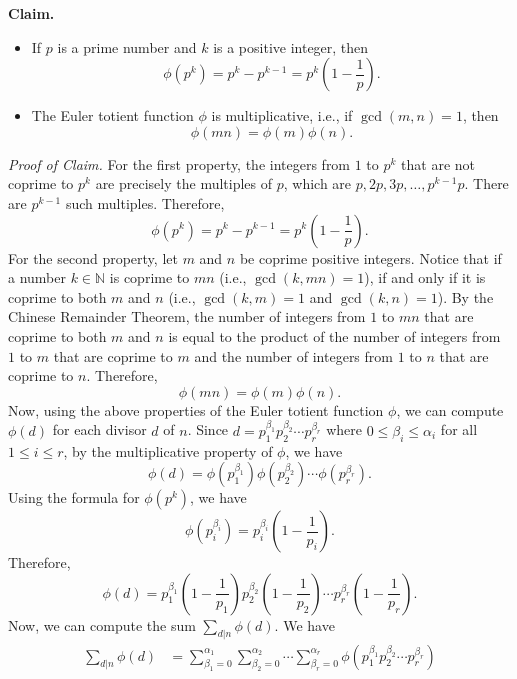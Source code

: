 \documentclass{elegantbook}
\begin{document}
\begin{problemset}[Exercises]
\begin{solution}
\begin{enumerate}[(a)]
      \textbf{Claim.}
      \begin{itemize}
        \item If $p$ is a prime number and $k$ is a positive integer, then
              \[
                \phi(p^k) = p^k - p^{k-1} = p^k \left(1 - \frac{1}{p}\right).
              \]
        \item The Euler totient function $\phi$ is multiplicative, i.e., if $\gcd(m,n) = 1$, then
              \[
                \phi(mn) = \phi(m) \phi(n).
              \]
      \end{itemize}

      \textit{Proof of Claim.} For the first property, the integers from $1$ to $p^k$ that are not coprime to $p^k$ are precisely the multiples of $p$, which are $p, 2p, 3p, \ldots, p^{k-1}p$. There are $p^{k-1}$ such multiples. Therefore,
      \[
        \phi(p^k) = p^k - p^{k-1} = p^k \left(1 - \frac{1}{p}\right).
      \]
      For the second property, let $m$ and $n$ be coprime positive integers. Notice that if a number $k\in\mathbb{N}$ is coprime to $mn$ (i.e., $\gcd(k,mn)=1$), if and only if it is coprime to both $m$ and $n$ (i.e., $\gcd(k,m)=1$ and $\gcd(k,n)=1$). By the Chinese Remainder Theorem, the number of integers from $1$ to $mn$ that are coprime to both $m$ and $n$ is equal to the product of the number of integers from $1$ to $m$ that are coprime to $m$ and the number of integers from $1$ to $n$ that are coprime to $n$. Therefore,
      \[
        \phi(mn) = \phi(m) \phi(n).
      \]
      Now, using the above properties of the Euler totient function $\phi$, we can compute $\phi(d)$ for each divisor $d$ of $n$. Since $d = p_1^{\beta_1} p_2^{\beta_2} \cdots p_r^{\beta_r}$ where $0 \leq \beta_i \leq \alpha_i$ for all $1 \leq i \leq r$, by the multiplicative property of $\phi$, we have
      \[
        \phi(d) = \phi(p_1^{\beta_1}) \phi(p_2^{\beta_2}) \cdots \phi(p_r^{\beta_r}).
      \]
      Using the formula for $\phi(p^k)$, we have
      \[
        \phi(p_i^{\beta_i}) = p_i^{\beta_i} \left(1 - \frac{1}{p_i}\right).
      \]
      Therefore,
      \[
        \phi(d) = p_1^{\beta_1} \left(1 - \frac{1}{p_1}\right) p_2^{\beta_2} \left(1 - \frac{1}{p_2}\right) \cdots p_r^{\beta_r} \left(1 - \frac{1}{p_r}\right).
      \]
      Now, we can compute the sum $\sum_{d|n} \phi(d)$. We have
      \[
      \begin{aligned}
        \sum_{d|n} \phi(d) &= \sum_{\beta_1=0}^{\alpha_1} \sum_{\beta_2=0}^{\alpha_2} \cdots \sum_{\beta_r=0}^{\alpha_r} \phi(p_1^{\beta_1} p_2^{\beta_2} \cdots p_r^{\beta_r}) \\

\end{aligned}\]
\end{enumerate}
\end{solution}
\end{problemset}
\end{document}
